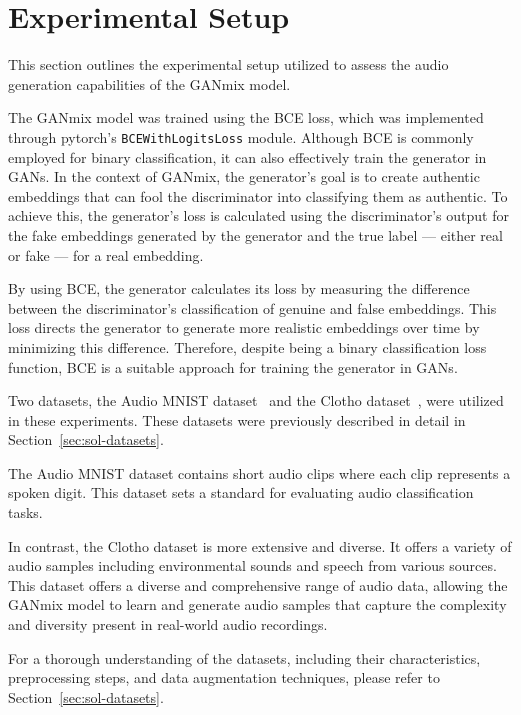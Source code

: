 \section{Experimental Setup} \label{sec:res-setup}

This section outlines the experimental setup utilized to assess the audio generation capabilities of the GANmix model.

The GANmix model was trained using the \ac{BCE} loss, which was implemented through pytorch's \texttt{BCEWithLogitsLoss} module. Although \ac{BCE} is commonly employed for binary classification, it can also effectively train the generator in \acp{GAN}. In the context of GANmix, the generator's goal is to create authentic embeddings that can fool the discriminator into classifying them as authentic. To achieve this, the generator's loss is calculated using the discriminator's output for the fake embeddings generated by the generator and the true label --- either real or fake --- for a real embedding.

By using \ac{BCE}, the generator calculates its loss by measuring the difference between the discriminator's classification of genuine and false embeddings. This loss directs the generator to generate more realistic embeddings over time by minimizing this difference. Therefore, despite being a binary classification loss function, \ac{BCE} is a suitable approach for training the generator in \acp{GAN}.

Two datasets, the Audio MNIST dataset~\cite{becker_interpreting_2018} and the Clotho dataset~\cite{drossos_clotho_2019}, were utilized in these experiments. These datasets were previously described in detail in Section~\ref{sec:sol-datasets}.

The Audio MNIST dataset contains short audio clips where each clip represents a spoken digit. This dataset sets a standard for evaluating audio classification tasks.

In contrast, the Clotho dataset is more extensive and diverse. It offers a variety of audio samples including environmental sounds and speech from various sources. This dataset offers a diverse and comprehensive range of audio data, allowing the GANmix model to learn and generate audio samples that capture the complexity and diversity present in real-world audio recordings.

For a thorough understanding of the datasets, including their characteristics, preprocessing steps, and data augmentation techniques, please refer to Section~\ref{sec:sol-datasets}.


